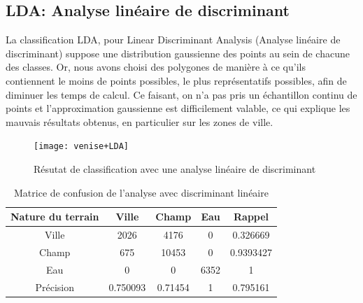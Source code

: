 \documentclass[a4paper,10pt]{article}
\begin{document}
\subsection{LDA: Analyse linéaire de discriminant}
La classification LDA, pour Linear Discriminant Analysis (Analyse linéaire de discriminant) suppose une distribution gaussienne des points au sein de chacune des classes. Or, nous avons choisi des polygones de manière à ce qu'ils contiennent le moins de points possibles, le plus représentatifs possibles, afin de diminuer les temps de calcul. Ce faisant, on n'a pas pris un échantillon continu de points et l'approximation gaussienne est difficilement valable, ce qui explique les mauvais résultats obtenus, en particulier sur les zones de ville.
\begin{figure}
  \centering
    \texttt{[image: venise+LDA]}
  \caption{Résutat de classification avec une analyse linéaire de discriminant}
  \label{fig:veniseLDA}
\end{figure}

\begin{table}
\begin{center}
 \begin{tabular}{|c|c|c|c|c|}
  \hline
  Nature du terrain & Ville & Champ & Eau & Rappel \\
  \hline
Ville & 2026  &   4176  &      0 & 0.326669 \\
Champ & 675  &  10453   &     0 & 0.9393427 \\
Eau &  0    &    0  &   6352   &     1 \\
Précision & 0.750093 & 0.71454  &      1 & 0.795161\\
  \hline
\end{tabular}
\end{center}
\caption{Matrice de confusion de l'analyse avec discriminant linéaire }
\label{table:veniseLDA}
\end{table}
    
     
\end{document}
